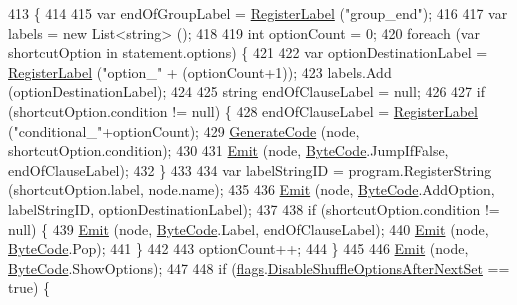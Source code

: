 \begin{DoxyCode}
413                                                                            \{
414 
415             var endOfGroupLabel = \hyperlink{a00043_a1bae0d8b701a59708641aa36ea971fa5}{RegisterLabel} (\textcolor{stringliteral}{"group\_end"});
416 
417             var labels = \textcolor{keyword}{new} List<string> ();
418 
419             \textcolor{keywordtype}{int} optionCount = 0;
420             \textcolor{keywordflow}{foreach} (var shortcutOption \textcolor{keywordflow}{in} statement.options) \{
421 
422                 var optionDestinationLabel = \hyperlink{a00043_a1bae0d8b701a59708641aa36ea971fa5}{RegisterLabel} (\textcolor{stringliteral}{"option\_"} + (optionCount+1));
423                 labels.Add (optionDestinationLabel);
424 
425                 \textcolor{keywordtype}{string} endOfClauseLabel = null;
426 
427                 \textcolor{keywordflow}{if} (shortcutOption.condition != null) \{
428                     endOfClauseLabel = \hyperlink{a00043_a1bae0d8b701a59708641aa36ea971fa5}{RegisterLabel} (\textcolor{stringliteral}{"conditional\_"}+optionCount);
429                     \hyperlink{a00043_a006f3becd521cc179ba3d3352f6f930b}{GenerateCode} (node, shortcutOption.condition);
430 
431                     \hyperlink{a00043_a774e8c143cdda0584fcfdda98626a83c}{Emit} (node, \hyperlink{a00040_ad5dfb6ee68ca7469623ad3e459f98894}{ByteCode}.JumpIfFalse, endOfClauseLabel);
432                 \}
433 
434                 var labelStringID = program.RegisterString (shortcutOption.label, node.name);
435 
436                 \hyperlink{a00043_a774e8c143cdda0584fcfdda98626a83c}{Emit} (node, \hyperlink{a00040_ad5dfb6ee68ca7469623ad3e459f98894}{ByteCode}.AddOption, labelStringID, optionDestinationLabel);
437 
438                 \textcolor{keywordflow}{if} (shortcutOption.condition != null) \{
439                     \hyperlink{a00043_a774e8c143cdda0584fcfdda98626a83c}{Emit} (node, \hyperlink{a00040_ad5dfb6ee68ca7469623ad3e459f98894}{ByteCode}.Label, endOfClauseLabel);
440                     \hyperlink{a00043_a774e8c143cdda0584fcfdda98626a83c}{Emit} (node, \hyperlink{a00040_ad5dfb6ee68ca7469623ad3e459f98894}{ByteCode}.Pop);
441                 \}
442 
443                 optionCount++;
444             \}
445 
446             \hyperlink{a00043_a774e8c143cdda0584fcfdda98626a83c}{Emit} (node, \hyperlink{a00040_ad5dfb6ee68ca7469623ad3e459f98894}{ByteCode}.ShowOptions);
447 
448             \textcolor{keywordflow}{if} (\hyperlink{a00043_a541022d89bcf9bc8f794eb6d6b438d08}{flags}.\hyperlink{a00043_a8b49bb7763ff477cba21d7c771ef3ed0}{DisableShuffleOptionsAfterNextSet} == \textcolor{keyword}{true}) \{

\end{DoxyCode}
